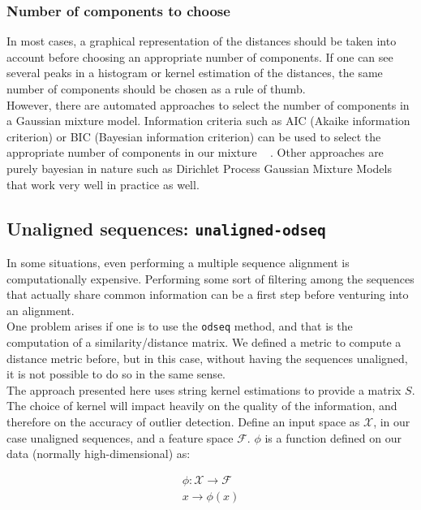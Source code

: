 \documentclass[a4paper]{llncs}
\begin{document}
\subsubsection{Number of components to choose}

In most cases, a graphical representation of the distances should be taken into account before choosing an appropriate number of components. If one can see several peaks in a histogram or kernel estimation of the distances, the same number of components should be chosen as a rule of thumb.\\

However, there are automated approaches to select the number of components in a Gaussian mixture model. Information criteria such as AIC (Akaike information criterion) or BIC (Bayesian information criterion) can be used to select the appropriate number of components in our mixture ~\cite{Huang2013} . Other approaches are purely bayesian in nature such as Dirichlet Process Gaussian Mixture Models that work very well in practice as well.

\subsection{Unaligned sequences: \texttt{unaligned-odseq}}

In some situations, even performing a multiple sequence alignment is computationally expensive. Performing some sort of filtering among the sequences that actually share common information can be a first step before venturing into an alignment.\\

One problem arises if one is to use the \texttt{odseq} method, and that is the computation of a similarity/distance matrix. We defined a metric to compute a distance metric before, but in this case, without having the sequences unaligned, it is not possible to do so in the same sense.\\

The approach presented here uses string kernel \cite{Lodhi2002} estimations to provide a matrix $S$. The choice of kernel will impact heavily on the quality of the information, and therefore on the accuracy of outlier detection. Define an input space as $\mathcal{X}$, in our case unaligned sequences, and a feature space $\mathcal{F}$. $\phi$ is a function defined on our data (normally high-dimensional) as:

\begin{gather}
\phi : \mathcal{X} \rightarrow \mathcal{F}\\
x \rightarrow \phi(x)
\end{gather}
\end{document}
